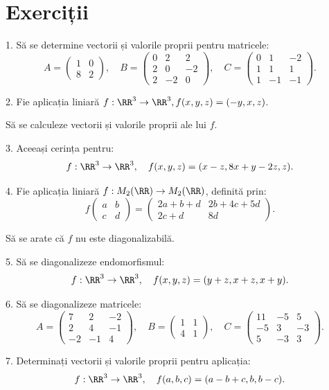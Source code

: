 
\section{Exerciții}

1. Să se determine vectorii și valorile proprii pentru matricele:
\[
  A = \begin{pmatrix} 1 & 0 \\ 8 & 2 \end{pmatrix}, \quad %
  B = \begin{pmatrix} 0 & 2 & 2 \\ 2 & 0 & -2 \\ 2 & -2 & 0 \end{pmatrix}, \quad %
  C = \begin{pmatrix} 0 & 1 & -2 \\ 1 & 1 & 1 \\ 1 & -1 & -1 \end{pmatrix}.
\]

2. Fie aplicația liniară $ f : \RR^3 \to \RR^3, f(x, y, z) = (-y, x, z) $.

Să se calculeze vectorii și valorile proprii ale lui $ f $.

\vspace{1cm}

3. Aceeași cerința pentru:
\[
  f : \RR^3 \to \RR^3, \quad f(x, y, z) = (x - z, 8x + y - 2z, z).
\]

4. Fie aplicația liniară $ f : M_2(\RR) \to M_2(\RR) $, definită prin:
\[
  f \begin{pmatrix} a & b \\ c & d \end{pmatrix} = %
  \begin{pmatrix} 2a + b + d & 2b + 4c + 5d \\ 2c + d & 8d \end{pmatrix}.
\]

Să se arate că $ f $ nu este diagonalizabilă.

\vspace{1cm}

5. Să se diagonalizeze endomorfismul:
\[
  f : \RR^3 \to \RR^3, \quad f(x, y, z) = (y + z, x + z, x + y).
\]

6. Să se diagonalizeze matricele:
\[
  A = \begin{pmatrix}
    7 & 2 & -2 \\
    2 & 4 & -1 \\
    -2 & -1 & 4
  \end{pmatrix}, \quad %
  B = \begin{pmatrix}
    1 & 1 \\ 4 & 1
  \end{pmatrix}, \quad %
  C = \begin{pmatrix}
    11 & -5 & 5 \\
    -5 & 3 & -3 \\
    5 & -3 & 3
  \end{pmatrix}.
\]


7. Determinați vectorii și valorile proprii pentru aplicația:
\[
  f : \RR^3 \to \RR^3, \quad f(a, b, c) = (a - b + c, b, b-c).
\]



